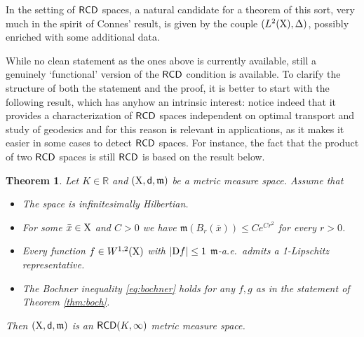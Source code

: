 \documentclass[11pt]{article}
\numberwithin{equation}{section}
\newtheorem{theorem}{Theorem}[section]
\newcommand{\R}{\mathbb{R}}
\newcommand{\X}{{\rm X}}
\newcommand{\sfd}{{\sf d}}
\newcommand{\mm}{{\mathfrak m}}
\newcommand{\RCD}{{\sf RCD}}
\newcommand{\D}{{\rm D}}
\begin{document}
In the setting of $\RCD$ spaces, a natural candidate for a theorem of this sort, very much in the spirit of Connes' result, is given by the couple $(L^2(\X),\Delta)$, possibly enriched with some additional data.

While no clean statement as the ones above is currently available, still a genuinely `functional' version of the $\RCD$ condition is available. To clarify the structure of both the statement and the proof, it is better to start with the following result, which has anyhow an intrinsic interest: notice indeed that it provides a characterization of $\RCD$ spaces independent on optimal transport and study of geodesics and for this reason is relevant in applications, as it makes it easier in some cases to detect $\RCD$ spaces. For instance, the fact that the product of two $\RCD$ spaces is still $\RCD$ is based on the result below.
\begin{theorem}\label{thm:reprinterm}
Let $K\in\R$ and $(\X,\sfd,\mm)$ be a metric measure space.  Assume that
\begin{itemize}
\item[a)] The space is infinitesimally Hilbertian.
\item[b)] For some $\bar x\in\X$ and $C>0$ we have $\mm(B_r(\bar x))\leq Ce^{Cr^2}$ for every $r>0$.
\item[c)] Every function $f\in W^{1,2}(\X)$ with $|\D f|\leq 1$ $\mm$-a.e.\ admits a 1-Lipschitz representative.
\item[d)] The Bochner inequality \eqref{eq:bochner} holds for any $f,g$ as in the statement of Theorem \ref{thm:boch}.
\end{itemize}
Then $(\X,\sfd,\mm)$ is an  $\RCD(K,\infty)$ metric measure space. 
\end{theorem}
\end{document}
